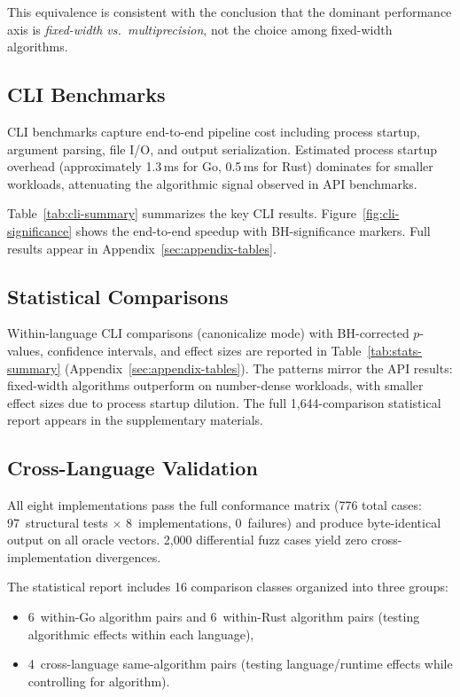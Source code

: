 This equivalence is consistent with the conclusion that the dominant performance axis is
\emph{fixed-width vs.\ multiprecision}, not the choice among
fixed-width algorithms.

\subsection{CLI Benchmarks}

CLI benchmarks capture end-to-end pipeline cost including process
startup, argument parsing, file I/O, and output serialization.  Estimated
process startup overhead (approximately 1.3\,ms for Go, 0.5\,ms for Rust)
dominates for smaller workloads, attenuating the algorithmic signal
observed in API benchmarks.

Table~\ref{tab:cli-summary} summarizes the key CLI results.
Figure~\ref{fig:cli-significance} shows the end-to-end speedup with
BH-significance markers.  Full results appear in
Appendix~\ref{sec:appendix-tables}.





\subsection{Statistical Comparisons}

Within-language CLI comparisons (canonicalize mode) with BH-corrected
$p$-values, confidence intervals, and effect sizes are reported in
Table~\ref{tab:stats-summary} (Appendix~\ref{sec:appendix-tables}).
The patterns mirror the API results: fixed-width algorithms outperform
\burgerdybvig on number-dense workloads, with smaller effect sizes due
to process startup dilution.  The full 1{,}644-comparison statistical
report appears in the supplementary materials.

\subsection{Cross-Language Validation}

All eight implementations pass the full conformance matrix (776 total
cases: 97~structural tests $\times$ 8~implementations, 0~failures) and
produce byte-identical output on all oracle vectors.  2{,}000
differential fuzz cases yield zero cross-implementation divergences.

The statistical report includes 16 comparison classes organized into
three groups:
\begin{itemize}
\item 6~within-Go algorithm pairs and 6~within-Rust algorithm pairs
      (testing algorithmic effects within each language),
\item 4~cross-language same-algorithm pairs (testing language/runtime
      effects while controlling for algorithm).
\end{itemize}

